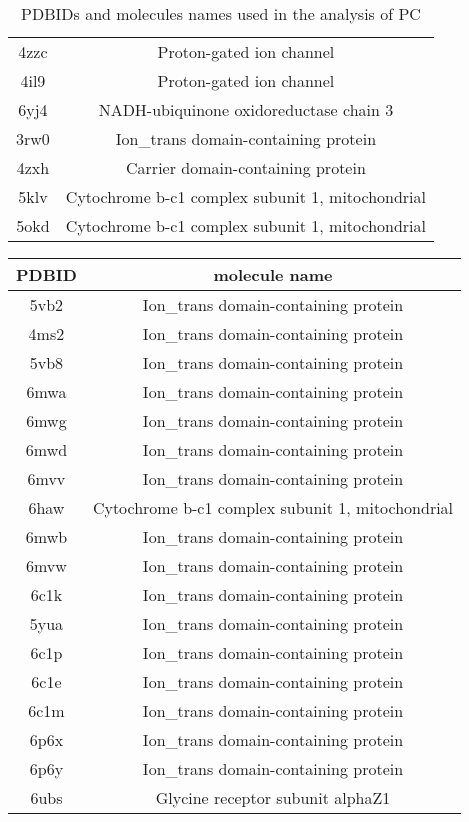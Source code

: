 \documentclass{article}
\begin{document}
\begin{table}[]
\begin{tabular}{c|c}
4zzc & Proton-gated ion channel \\ 
4il9 & Proton-gated ion channel \\ 
6yj4 & NADH-ubiquinone oxidoreductase chain 3 \\ 
3rw0 & Ion\_trans domain-containing protein \\ 
4zxh & Carrier domain-containing protein \\ 
5klv & Cytochrome b-c1 complex subunit 1, mitochondrial \\ 
5okd & Cytochrome b-c1 complex subunit 1, mitochondrial \\ 
    \end{tabular}
    \caption{PDBIDs and molecules names used in the analysis of PC}
    \label{tab:my_label}
\end{table}

\begin{table}[]
    \centering
    \begin{tabular}{c|c}
PDBID & molecule name \\
\hline
5vb2 & Ion\_trans domain-containing protein \\ 
4ms2 & Ion\_trans domain-containing protein \\ 
5vb8 & Ion\_trans domain-containing protein \\ 
6mwa & Ion\_trans domain-containing protein \\ 
6mwg & Ion\_trans domain-containing protein \\ 
6mwd & Ion\_trans domain-containing protein \\ 
6mvv & Ion\_trans domain-containing protein \\ 
6haw & Cytochrome b-c1 complex subunit 1, mitochondrial \\ 
6mwb & Ion\_trans domain-containing protein \\ 
6mvw & Ion\_trans domain-containing protein \\ 
6c1k & Ion\_trans domain-containing protein \\ 
5yua & Ion\_trans domain-containing protein \\ 
6c1p & Ion\_trans domain-containing protein \\ 
6c1e & Ion\_trans domain-containing protein \\ 
6c1m & Ion\_trans domain-containing protein \\ 
6p6x & Ion\_trans domain-containing protein \\ 
6p6y & Ion\_trans domain-containing protein \\ 
6ubs & Glycine receptor subunit alphaZ1 \\ 

\end{tabular}
\end{table}
\end{document}
